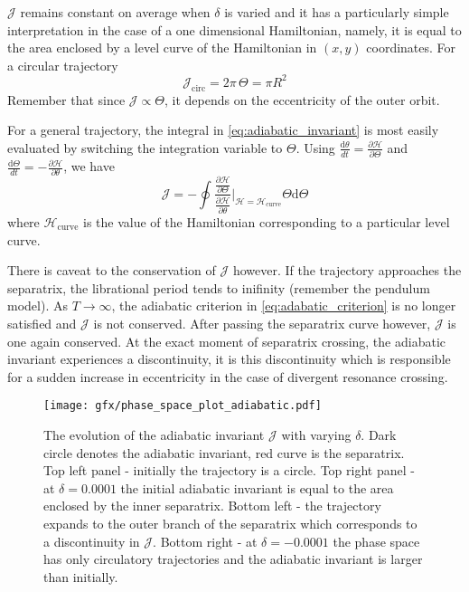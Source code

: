 $\mathcal{J}$
remains constant on average when $\delta$ is varied and it has a 
particularly simple interpretation in the case of a one dimensional
Hamiltonian, namely, it is equal to the area enclosed by a level
curve of the Hamiltonian in $(x,y)$ coordinates. For a circular trajectory
\begin{equation}
    \mathcal{J}_\text{circ}=2\pi\,\Theta=\pi R^2
    \label{eq:J_circular}
\end{equation}
Remember that since $\mathcal{J}\propto\Theta$, it depends on the 
eccentricity of the outer orbit. 

For a general trajectory, the integral in \cref{eq:adiabatic_invariant}
is most easily evaluated by switching the integration variable to $\Theta$.
Using $\frac{\mathrm{d}\theta}{dt}=\frac{\partial\mathcal{H}}{\partial\Theta}$
and $ \frac{\mathrm{d}\Theta}{dt} =- \frac{\partial\mathcal{H}}{\partial\theta}$,
we have 
\begin{equation}
    \mathcal{J}=-\oint \frac{\frac{\partial\mathcal{H}}{\partial\Theta}}{
        \frac{\partial\mathcal{H}}{\partial\theta}}
    \bigg\rvert_{\mathcal{H}=\mathcal{H}_\text{curve}}\Theta\mathrm{d}\Theta 
\end{equation}
where $\mathcal{H}_\text{curve}$ is the value of the Hamiltonian corresponding
to a particular level curve.

There is caveat to the conservation of $\mathcal{J}$ however. If the trajectory 
approaches
the separatrix, the librational period tends to inifinity (remember the pendulum
model). As $T\rightarrow\infty$, the adiabatic criterion in 
\cref{eq:adabatic_criterion} is no longer satisfied and $\mathcal{J}$ is not
conserved. After passing the separatrix curve however, $\mathcal{J}$ is 
one again conserved. At the exact moment of separatrix crossing, the 
adiabatic invariant experiences a discontinuity, it is this discontinuity
which is responsible for a sudden increase in eccentricity in the case
of divergent resonance crossing.
\begin{figure}[htb]
\centering
\texttt{[image: gfx/phase\_space\_plot\_adiabatic.pdf]}
    \caption{The evolution of the adiabatic invariant $\mathcal{J}$
    with varying $\delta$.
    Dark circle denotes the adiabatic invariant, red curve is the 
    separatrix. Top left panel - initially the trajectory is a circle.
    Top right panel - at $\delta=0.0001$ the initial adiabatic invariant
    is equal to the area enclosed by the inner separatrix. Bottom left
    - the trajectory expands to the outer branch of the separatrix which
    corresponds to a discontinuity in $\mathcal{J}$. Bottom right -
    at $\delta=-0.0001$ the phase space has only circulatory trajectories
    and the adiabatic invariant is larger than initially.}
\label{fig:phase_space_adiabatic}
\end{figure}

